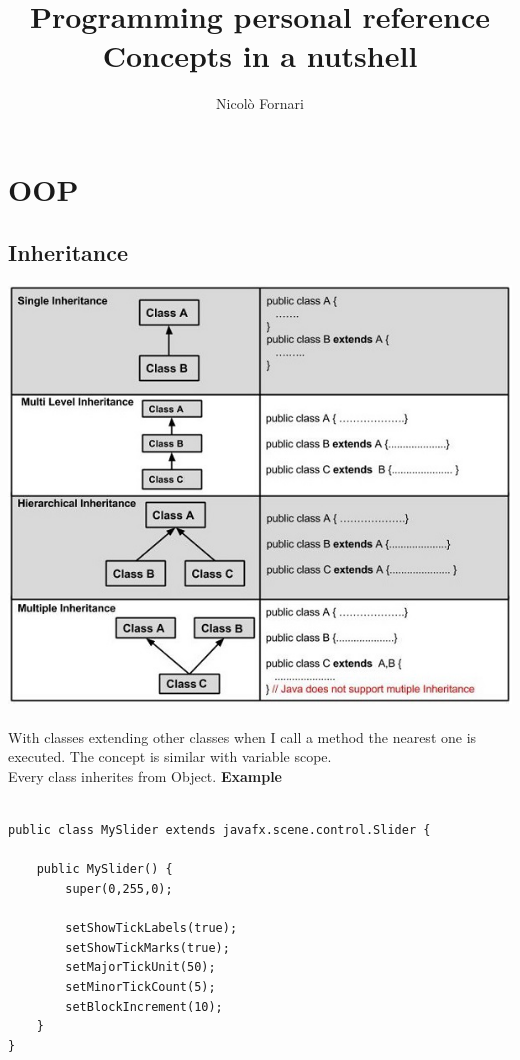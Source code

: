 \documentclass[10pt,a4paper]{book}
\title{Programming personal reference\\ \Large Concepts in a nutshell}
\author{Nicolò Fornari}
\begin{document}
\maketitle
\chapter{OOP}
\section{Inheritance}
\includegraphics[scale=0.7]{img/inheritance.jpg}
\\\\
With classes extending other classes when I call a method the nearest one is executed. The concept is similar with variable scope.\\
Every class inherites from Object.
\newpage
\textbf{Example}\\\\
\begin{verbatim}
public class MySlider extends javafx.scene.control.Slider {
    
    public MySlider() {
        super(0,255,0);
    
        setShowTickLabels(true);
        setShowTickMarks(true);
        setMajorTickUnit(50);
        setMinorTickCount(5);
        setBlockIncrement(10);
    }
}
\end{verbatim}
\newpage
\end{document}
